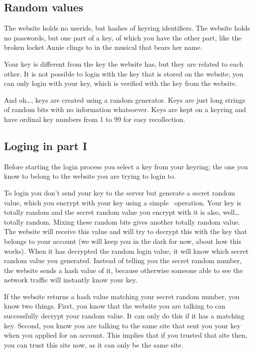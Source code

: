 \subsection{Random values}
The website holds no userids, but hashes of keyring identifiers.
The website holds no passwords, but one part of a key, of which you have the other part,
like the broken locket Annie clings to in the musical that bears her name.
\par
Your key is different from the key the website has, but they are related to each other.
It is not possible to login with the key that is stored on the website;
you can only login with your key, which is verified with the key from the website.
\par
And oh\ldots, keys are created using a random generator.
Keys are just long strings of random bits with no information whatsoever.
Keys are kept on a keyring and have ordinal key numbers from 1 to 99 for easy recollection.

\subsection{Loging in part I}
Before starting the login process you select a key from your keyring;
the one you know to belong to the website you are trying to login to.
\par
To login you don't send your key to the server but generate a secret random value,
which you encrypt with your key using a simple \XOR\ operation.
Your key is totally random and the secret random value you encrypt with it is also, well\ldots totally random.
Mixing these random bits gives another totally random value.
The website will receive this value and will try to decrypt this with the key that belongs to your account
(we will keep you in the dark for now, about how this works).
When it has decrypted the random login value,
it will know which secret random value you generated.
Instead of telling you the secret random number,
the website sends a hash value of it,
because otherwise someone able to see the network traffic will instantly know your key.
\par
If the website returns a hash value matching your secret random number, you know two things.
First, you know that the website you are talking to can successfully decrypt your random value.
It can only do this if it has a matching key.
Second, you know you are talking to the same site that sent you your key when you applied for an account.
This implies that if you trusted that site then, you can trust this site now, as it can only be the same site.

